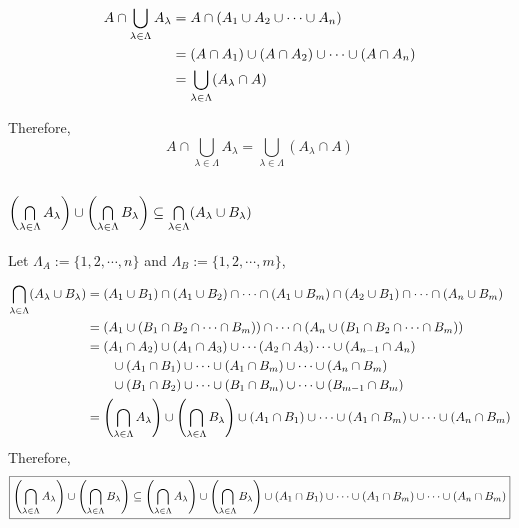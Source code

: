 \documentclass[]{article}
\begin{document}
\begin{align*}
	A \cap \bigcup\limits_{\lambda \in \Lambda}  A_\lambda
	&= A \cap \qty(A_1 \cup A_2 \cup \cdots \cup A_n)\\
	&= (A \cap A_1) \cup (A \cap A_2) \cup \cdots \cup (A \cap A_n)\\
	&= \bigcup\limits_{\lambda \in \Lambda} (A_\lambda \cap A)
\end{align*}

Therefore,
\begin{displaymath}
	\boxed{A \cap \bigcup\limits_{\lambda \in \Lambda}  A_\lambda
	= \bigcup\limits_{\lambda \in \Lambda} (A_\lambda \cap A)}
\end{displaymath}


\subsection{
	$\qty(\bigcap\limits_{\lambda\in\Lambda} A_{\lambda}) \cup
	 \qty(\bigcap\limits_{\lambda\in\Lambda} B_{\lambda})
	 \subseteq \bigcap\limits_{\lambda\in\Lambda} (A_\lambda \cup B_\lambda)$
}

Let $\Lambda_A := \{1, 2, \cdots, n\}$ and $\Lambda_B := \{1, 2, \cdots, m\}$,

\begin{align*}
	\bigcap\limits_{\lambda\in\Lambda} (A_\lambda \cup B_\lambda)
	&= (A_1 \cup B_1) \cap (A_1 \cup B_2) \cap 
	\cdots \cap (A_1 \cup B_m) \cap (A_2 \cup B_1) \cap
	\cdots \cap (A_n \cup B_m)\\
	&= \qty(A_1 \cup \qty(B_1 \cap B_2 \cap \cdots \cap B_m)) \cap \cdots
	\cap \qty(A_n \cup \qty(B_1 \cap B_2 \cap \cdots \cap B_m))\\
	&= (A_1 \cap A_2) \cup (A_1 \cap A_3) \cup \cdots (A_2 \cap A_3) \cdots 
	\cup (A_{n-1} \cap A_n)\\
	&\qquad \cup (A_1 \cap B_1) \cup \cdots \cup (A_1 \cap B_m) \cup \cdots \cup (A_n \cap B_m)\\
	&\qquad \cup (B_1 \cap B_2) \cup \cdots	\cup (B_1 \cap B_m) \cup \cdots \cup (B_{m-1} \cap B_{m})\\
	&= \qty(\bigcap\limits_{\lambda\in\Lambda} A_{\lambda}) \cup 
	\qty(\bigcap\limits_{\lambda\in\Lambda} B_{\lambda})
	\cup (A_1 \cap B_1) \cup \cdots \cup (A_1 \cap B_m) \cup \cdots \cup (A_n \cap B_m)\\
\end{align*}
Therefore,
\begin{align*}
	\boxed{
	\qty(\bigcap\limits_{\lambda\in\Lambda} A_{\lambda}) \cup
	\qty(\bigcap\limits_{\lambda\in\Lambda} B_{\lambda})
	\subseteq \qty(\bigcap\limits_{\lambda\in\Lambda} A_{\lambda}) \cup 
	\qty(\bigcap\limits_{\lambda\in\Lambda} B_{\lambda})
	\cup (A_1 \cap B_1) \cup \cdots \cup (A_1 \cap B_m) \cup \cdots \cup (A_n \cap B_m)
	}
\end{align*}
\end{document}
